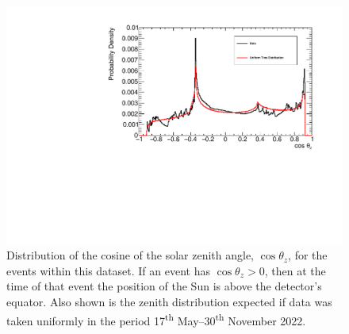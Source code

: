 \begin{figure}[!th]
    \centering
    \includegraphics[width=\textwidth]{6_SolarAnalysis/images/solar_zenith_dist_versus_uniform.pdf}
    \caption[Distribution of $\cos{\theta_{z}}$, for the events within this dataset, compared to a uniform time distribution]
    {Distribution of the cosine of the solar zenith angle, $\cos{\theta_{z}}$, for the events within this dataset. If an event has $\cos{\theta_{z}}>0$, then at the time of that event the position of the Sun is above the detector's equator. Also shown is the zenith distribution expected if data was taken uniformly in the period 17\textsuperscript{th} May--30\textsuperscript{th} November 2022.}
    \label{fig:solar_zenith_distribution}
\end{figure}

